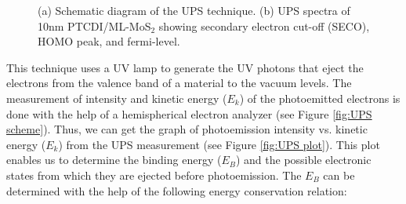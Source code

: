 \documentclass[12pt]{article}
\begin{document}
\begin{figure}[H]
\centering
{}
\caption{(a) Schematic diagram of the UPS technique. (b) UPS spectra of 10nm PTCDI/ML-MoS$_2$ showing secondary electron cut-off (SECO), HOMO peak, and fermi-level.}
\label{fig:UPS method}
\end{figure}


This technique uses a UV lamp to generate the UV photons that eject the electrons from the valence band of a material to the vacuum levels. The measurement of intensity and kinetic energy ($E_k$) of the photoemitted electrons is done with the help of a hemispherical electron analyzer (see Figure \ref{fig:UPS scheme}). Thus, we can get the graph of photoemission intensity vs. kinetic energy ($E_k$) from the UPS measurement (see Figure \ref{fig:UPS plot}). This plot enables us to determine the binding energy ($E_B$) and the possible electronic states from which they are ejected before photoemission. The $E_B$ can be determined with the help of the following energy conservation relation:
\end{document}
